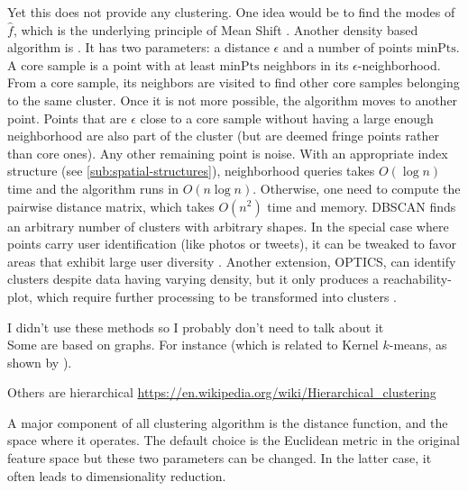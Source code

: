 Yet this does not provide any clustering. One idea would be to find the modes of
$\hat{f}$, which is the underlying principle of Mean Shift
\autocite{MeanShift95}. Another density based algorithm is
 \autocite{DBSCAN96}. It has two parameters: a
distance $\epsilon$ and a number of points $\mathrm{minPts}$. A core sample is
a point with at least $\mathrm{minPts}$ neighbors in its
$\epsilon$-neighborhood. From a core sample, its neighbors are visited to find
other core samples belonging to the same cluster. Once it is not more possible,
the algorithm moves to another point. Points that are $\epsilon$ close to a
core sample without having a large enough neighborhood are also part of the
cluster (but are deemed fringe points rather than core ones). Any other
remaining point is noise. With an appropriate index structure (see
\autoref{sub:spatial-structures}), neighborhood queries takes $O(\log n)$ time
and the algorithm runs in $O(n\log n)$. Otherwise, one need to compute the
pairwise distance matrix, which takes $O(n^2)$ time and memory. DBSCAN finds
an arbitrary number of clusters with arbitrary shapes. In the special case where
points carry user identification (like photos or tweets), it can be tweaked to
favor areas that exhibit large user diversity \autocite{PDBSCANKisilevich2010}.
Another extension, OPTICS, can identify clusters despite data having varying
density, but it only produces a reachability-plot, which require further
processing to be transformed into clusters \autocite{OPTICS99}.

\begin{comments}
	I didn't use these methods so I probably don't need to talk about it\\
	Some are based on graphs. For instance  \autocite{SpectralClustering01} (which is related to
	Kernel $k$-means, as shown by \textcite{KernelKmeans04}).
	 \autocite{AffinityPropagation07}

	Others are hierarchical
\url{https://en.wikipedia.org/wiki/Hierarchical_clustering}
\end{comments}

A major component of all clustering algorithm is the distance function, and
the space where it operates. The default choice is the Euclidean metric in the
original feature space but these two parameters can be changed. In the latter
case, it often leads to dimensionality reduction.

